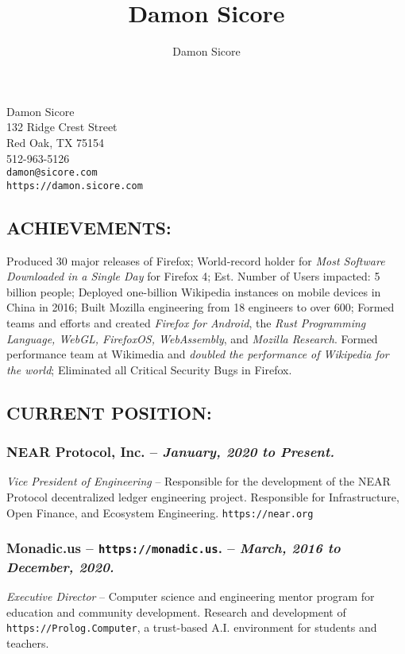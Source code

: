 \documentclass[10pt]{report}
\author{Damon Sicore}
\title{Damon Sicore}
\begin{document}
\begin{center}
\LARGE Damon Sicore \\
\normalsize
132 Ridge Crest Street \\
Red Oak, TX 75154 \\
512-963-5126\\
\texttt{damon@sicore.com}\\
\texttt{https://damon.sicore.com}\\
\end{center}

\subsection*{ACHIEVEMENTS:}  Produced 30 major releases of Firefox; World-record
holder for \emph{Most Software Downloaded in a Single Day} for Firefox 4; Est.
Number of Users impacted: 5 billion people;  Deployed one-billion Wikipedia
instances on mobile devices in China in 2016; Built Mozilla engineering from 18
engineers to over 600;  Formed teams and efforts and created \emph{Firefox for
Android}, the \emph{Rust Programming Language, WebGL, FirefoxOS, WebAssembly},
and \emph{Mozilla Research}.  Formed performance team at Wikimedia and
\emph{doubled the performance of Wikipedia for the world}; Eliminated all
Critical Security Bugs in Firefox.

\subsection*{CURRENT POSITION:}

\subsubsection*{NEAR Protocol, Inc. -- \emph{January, 2020 to Present. }}
\emph{Vice President of Engineering} -- Responsible for the development of the 
NEAR Protocol decentralized ledger engineering project. Responsible for Infrastructure, 
Open Finance, and Ecosystem Engineering.  
\texttt{https://near.org}


\subsubsection*{Monadic.us -- \texttt{https://monadic.us}. -- \emph{March, 2016 to December, 2020. }}
\emph{Executive Director} -- Computer science and engineering mentor program for
education and community development.  Research and development of
\texttt{https://Prolog.Computer}, a trust-based A.I. environment for students
and teachers.
\end{document}
